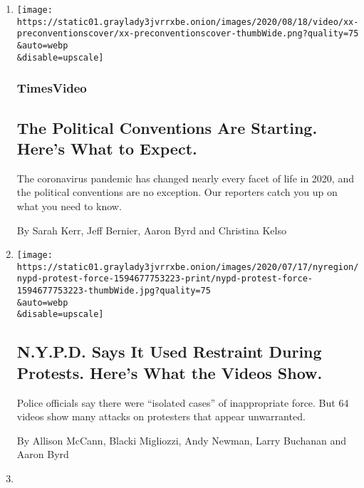 \begin{enumerate}
\def\labelenumi{\arabic{enumi}.}
\item
  \href{/video/us/politics/100000007219397/national-conventions-election.html}{}

  \texttt{[image: https://static01.graylady3jvrrxbe.onion/images/2020/08/18/video/xx-preconventionscover/xx-preconventionscover-thumbWide.png?quality=75\\\&auto=webp\\\&disable=upscale]}

  \hypertarget{timesvideo}{%
  \subsubsection{TimesVideo}\label{timesvideo}}

  \hypertarget{the-political-conventions-are-starting-heres-what-to-expect}{%
  \subsection{The Political Conventions Are Starting. Here's What to
  Expect.}\label{the-political-conventions-are-starting-heres-what-to-expect}}

  The coronavirus pandemic has changed nearly every facet of life in
  2020, and the political conventions are no exception. Our reporters
  catch you up on what you need to know.

  By Sarah Kerr, Jeff Bernier, Aaron Byrd and Christina Kelso
\item
  \href{/interactive/2020/07/14/nyregion/nypd-george-floyd-protests.html}{}

  \texttt{[image: https://static01.graylady3jvrrxbe.onion/images/2020/07/17/nyregion/nypd-protest-force-1594677753223-print/nypd-protest-force-1594677753223-thumbWide.jpg?quality=75\\\&auto=webp\\\&disable=upscale]}

  \hypertarget{nypd-says-it-used-restraint-during-protests-heres-what-the-videos-show}{%
  \subsection{N.Y.P.D. Says It Used Restraint During Protests. Here's
  What the Videos
  Show.}\label{nypd-says-it-used-restraint-during-protests-heres-what-the-videos-show}}

  Police officials say there were ``isolated cases'' of inappropriate
  force. But 64 videos show many attacks on protesters that appear
  unwarranted.

  By Allison McCann, Blacki Migliozzi, Andy Newman, Larry Buchanan and
  Aaron Byrd
\item
  \href{/video/nyregion/100000007092240/coronavirus-covid-patients-classical-music.html}{}


\end{enumerate}
